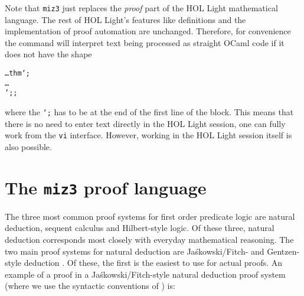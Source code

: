 \documentclass{LMCS}
\let\xmedskip=\medskip
\def\tstrut{{\vrule height8.5pt depth3pt width0pt}}
\def\creturn{}
\def\creturn{}
\begin{document}
Note that \texttt{miz3} just replaces the \emph{proof} part of
the HOL Light mathematical language.
The rest of HOL Light's features like definitions and
the implementation of proof automation are unchanged.
Therefore, for convenience the \fbox{\creturn\tstrut} command will interpret
text being processed as straight OCaml code if it
does not have the shape
\begingroup
\def\name{}
\def\rest{}
\xmedskip
\begin{alltt}
  \dots thm `;
    \dots
  `;;
\end{alltt}
\xmedskip
\endgroup
\noindent
where the \texttt{`;} has to be at the end of the first line
of the block.
This means that there is no need to enter text directly in the HOL Light session,
one can fully work from the \texttt{vi} interface.
However, working in the HOL Light session itself is also possible.


\section{The \texttt{miz3} proof language}\label{language}

\noindent
The three most common proof systems for first order predicate
logic are natural deduction, sequent calculus and Hilbert-style logic.
Of these three, natural deduction corresponds most closely with
everyday mathematical reasoning.
The two main proof systems for natural deduction are
Ja\'skowski/Fitch- and Gentzen-style deduction \cite{pel:00}.
Of these, the first is the easiest to use for actual proofs.
An example of a proof in a Ja\'skowski/Fitch-style natural deduction
proof system (where we use the syntactic conventions of \cite{hut:rya:04}) is:
\end{document}
